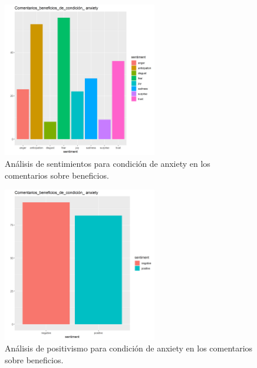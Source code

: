 \documentclass[spanish,]{article}
\begin{document}
\begin{figure}[h]
    \centering
    \includegraphics[width=0.6\textwidth]{figuras/sentimientos/Aanxiety1.png}
    \caption{Análisis de sentimientos para condición de anxiety en los comentarios sobre beneficios.}
    \label{fig:sentimientos:5}
\end{figure}

\begin{figure}[h]
    \centering
    \includegraphics[width=0.6\textwidth]{figuras/sentimientos/Aanxiety2.png}
    \caption{Análisis de positivismo para condición de anxiety en los comentarios sobre beneficios.}
    \label{fig:sentimientos:6}
\end{figure}
\end{document}
